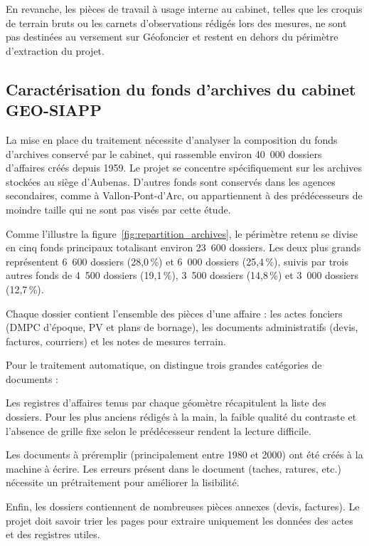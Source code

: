 En revanche, les pièces de travail à usage interne au cabinet, telles que les croquis de terrain bruts ou les carnets d'observations rédigés lors des mesures, ne sont pas destinées au versement sur Géofoncier et restent en dehors du périmètre d'extraction du projet.


\subsection{Caractérisation du fonds d'archives du cabinet GEO-SIAPP}

La mise en place du traitement nécessite d'analyser la composition du fonds d'archives conservé par le cabinet, qui rassemble environ 40~000 dossiers d'affaires créés depuis 1959. Le projet se concentre spécifiquement sur les archives stockées au siège d'Aubenas. D'autres fonds sont conservés dans les agences secondaires, comme à Vallon-Pont-d'Arc, ou appartiennent à des prédécesseurs de moindre taille qui ne sont pas visés par cette étude.

Comme l'illustre la figure~\ref{fig:repartition_archives}, le périmètre retenu se divise en cinq fonds principaux totalisant environ 23~600 dossiers. Les deux plus grands représentent 6~600 dossiers (28,0\,\%) et 6~000 dossiers (25,4\,\%), suivis par trois autres fonds de 4~500 dossiers (19,1\,\%), 3~500 dossiers (14,8\,\%) et 3~000 dossiers (12,7\,\%).

Chaque dossier contient l'ensemble des pièces d'une affaire : les actes fonciers (DMPC d'époque, PV et plans de bornage), les documents administratifs (devis, factures, courriers) et les notes de mesures terrain.

Pour le traitement automatique, on distingue trois grandes catégories de documents :

Les registres d'affaires tenus par chaque géomètre récapitulent la liste des dossiers. Pour les plus anciens rédigés à la main, la faible qualité du contraste et l'absence de grille fixe selon le prédécesseur rendent la lecture difficile.

Les documents à préremplir (principalement entre 1980 et 2000) ont été créés à la machine à écrire. Les erreurs présent dans le document (taches, ratures, etc.) nécessite un prétraitement pour améliorer la lisibilité.

Enfin, les dossiers contiennent de nombreuses pièces annexes (devis, factures). Le projet doit savoir trier les pages pour extraire uniquement les données des actes et des registres utiles.


